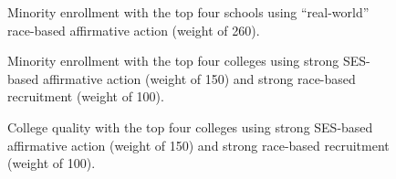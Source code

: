 \begin{figure}
  \centering
  \hfill%
  \caption{Minority enrollment with the top four schools using ``real-world'' race-based affirmative action (weight of 260).}
  \label{fig:c2}
\end{figure}

\begin{figure}
  \centering
  \hfill%
  \caption{Minority enrollment with the top four colleges using strong SES-based affirmative action (weight of 150) and strong race-based recruitment (weight of 100).}
  \label{fig:c4}
\end{figure}

\begin{figure}
  \centering
  \hfill%
  \caption{College quality with the top four colleges using strong SES-based affirmative action (weight of 150) and strong race-based recruitment (weight of 100).}
  \label{fig:c5}
\end{figure}

